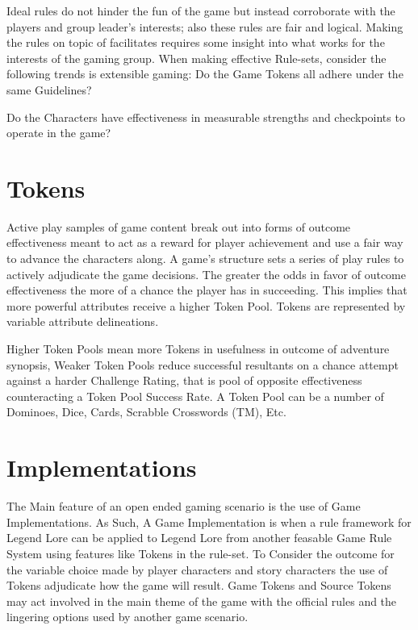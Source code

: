 \documentclass{article}
\begin{document}
Ideal rules do not hinder the fun of the game but instead corroborate with the players and group leader's interests; also  these rules are fair and logical. Making the rules on topic of facilitates requires some insight into what works for the interests of the gaming group. When making effective Rule-sets, consider the following trends is extensible gaming: Do the Game Tokens all adhere under the same Guidelines?

Do the Characters have effectiveness in measurable strengths and checkpoints to operate  in the game?

\section{Tokens}

Active play samples of game content break out into forms of outcome effectiveness meant to act as a reward for player achievement and use a fair way to advance the characters along.  A game's structure sets a series of play rules to actively adjudicate the game decisions. The greater the odds in favor of outcome effectiveness the more of a chance the player has in succeeding. This implies that more powerful attributes receive a higher Token Pool. Tokens are represented by variable attribute delineations.

Higher Token Pools mean more Tokens in usefulness in outcome of adventure synopsis, Weaker Token Pools reduce successful resultants on a chance attempt against a harder Challenge Rating, that is pool of opposite effectiveness counteracting a Token Pool Success Rate. A Token Pool can be a number of Dominoes, Dice, Cards, Scrabble Crosswords (TM), Etc.

\section{Implementations}

The Main feature of an open ended gaming scenario is the use of Game Implementations. As Such, A Game Implementation is when a rule framework for Legend Lore can be applied to Legend Lore from another feasable Game Rule System using features like Tokens in the rule-set.  To Consider the outcome for the variable choice made by player characters and story characters the use of Tokens adjudicate how the game will result. Game Tokens and Source Tokens may act  involved in the main theme of the game with the official rules and the lingering options used by another game scenario.
\end{document}
